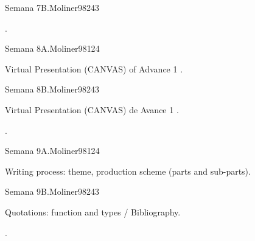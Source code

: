\begin{syllabus}
\begin{unit}{Semana 7B.}{}{Moliner98}{24}{3}
   \begin{learningoutcomes}
      \item . 
      \end{learningoutcomes}
\end{unit}

\begin{unit}{Semana 8A.}{}{Moliner98}{12}{4}
   \begin{topics}
      \item Virtual Presentation (CANVAS) of Advance 1 .
   \end{topics}
   \begin{learningoutcomes}
      \item 
   \end{learningoutcomes}
\end{unit}

\begin{unit}{Semana 8B.}{}{Moliner98}{24}{3}
   \begin{topics}
      \item Virtual Presentation (CANVAS) de Avance 1 .
   \end{topics}

   \begin{learningoutcomes}
      \item .
      \end{learningoutcomes}
\end{unit}

\begin{unit}{Semana 9A.}{}{Moliner98}{12}{4}
   \begin{topics}
      \item Writing process: theme, production scheme (parts and sub-parts).
   \end{topics}
   \begin{learningoutcomes}
      \item 
   \end{learningoutcomes}
\end{unit}

\begin{unit}{Semana 9B.}{}{Moliner98}{24}{3}
   \begin{topics}
      \item Quotations: function and types / Bibliography.
   \end{topics}

   \begin{learningoutcomes}
      \item .
      \end{learningoutcomes}
\end{unit}



\end{syllabus}
